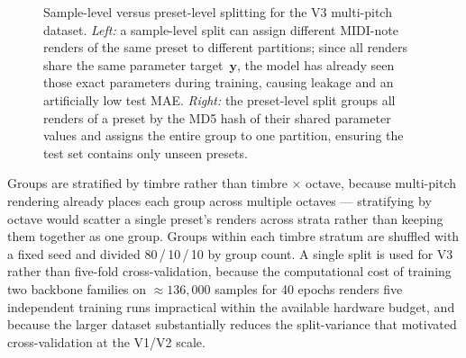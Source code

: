 \begin{figure}[H]
{%
}
\vspace{0.3cm}
\caption{Sample-level versus preset-level splitting for the V3 multi-pitch dataset. \textit{Left:} a sample-level split can assign different MIDI-note renders of the same preset to different partitions; since all renders share the same parameter target~$\mathbf{y}$, the model has already seen those exact parameters during training, causing leakage and an artificially low test MAE. \textit{Right:} the preset-level split groups all renders of a preset by the MD5 hash of their shared parameter values and assigns the entire group to one partition, ensuring the test set contains only unseen presets.}
\label{fig:preset_split}
\end{figure}

\noindent Groups are stratified by timbre rather than timbre $\times$ octave, because multi-pitch rendering already places each group across multiple octaves --- stratifying by octave would scatter a single preset's renders across strata rather than keeping them together as one group. Groups within each timbre stratum are shuffled with a fixed seed and divided 80\,/\,10\,/\,10 by group count. A single split is used for V3 rather than five-fold cross-validation, because the computational cost of training two backbone families on $\approx 136{,}000$ samples for 40 epochs renders five independent training runs impractical within the available hardware budget, and because the larger dataset substantially reduces the split-variance that motivated cross-validation at the V1/V2 scale.


